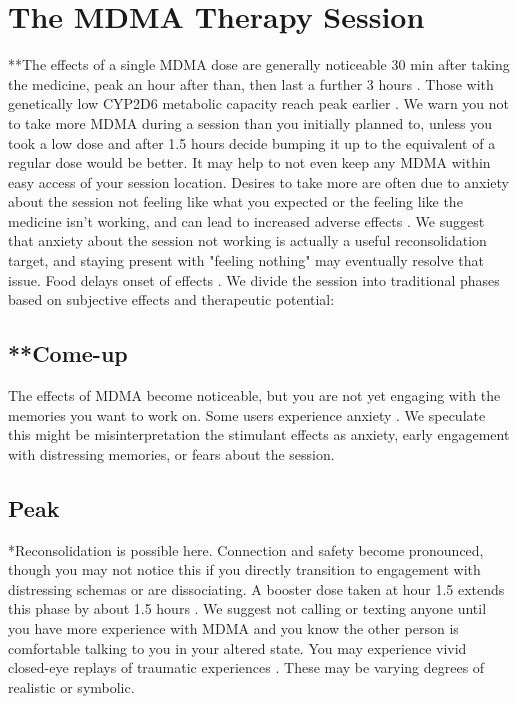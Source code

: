 \documentclass[12pt,letterpaper]{book}
\begin{document}
\section{The MDMA Therapy Session}
\label{session}
**The effects of a single MDMA dose are generally noticeable 30 min after taking the medicine, peak an hour after than, then last a further 3 hours \cite{vizeliActuteEffects}. Those with genetically low CYP2D6 metabolic capacity reach peak earlier \cite{schmid2016cyp2d6}. We warn you not to take more MDMA during a session than you initially planned to, unless you took a low dose and after 1.5 hours decide bumping it up to the equivalent of a regular dose would be better. It may help to not even keep any MDMA within easy access of your session location. Desires to take more are often due to anxiety about the session not feeling like what you expected or the feeling like the medicine isn't working, and can lead to increased adverse effects \cite{bruntLinking}. We suggest that anxiety about the session not working is actually a useful reconsolidation target, and staying present with "feeling nothing" may eventually resolve that issue. Food delays onset of effects \cite{MithoeferMDMA}. We divide the session into traditional phases based on subjective effects and therapeutic potential:

\subsection*{**Come-up}
The effects of MDMA become noticeable, but you are not yet engaging with the memories you want to work on. Some users experience anxiety \cite{hillsSolo}. We speculate this might be misinterpretation the stimulant effects as anxiety, early engagement with distressing memories, or fears about the session.

\subsection*{Peak}
*Reconsolidation is possible here. Connection and safety become pronounced, though you may not notice this if you directly transition to engagement with distressing schemas or are dissociating. A booster dose taken at hour 1.5 extends this phase by about 1.5 hours . We suggest not calling or texting anyone until you have more experience with MDMA and you know the other person is comfortable talking to you in your altered state. You may experience vivid closed-eye replays of traumatic experiences \cite{liechtiGender}. These may be varying degrees of realistic or symbolic.
\end{document}
